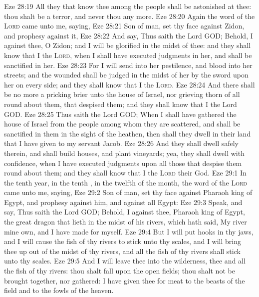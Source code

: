 \vs Eze 28:19 All they that know thee among the people shall be astonished at thee: thou shalt be a terror, and never  thou  any more.
\vs Eze 28:20 Again the word of the \textsc{Lord} came unto me, saying,
\vs Eze 28:21 Son of man, set thy face against Zidon, and prophesy against it,
\vs Eze 28:22 And say, Thus saith the Lord GOD; Behold, I  against thee, O Zidon; and I will be glorified in the midst of thee: and they shall know that I  the \textsc{Lord}, when I shall have executed judgments in her, and shall be sanctified in her.
\vs Eze 28:23 For I will send into her pestilence, and blood into her streets; and the wounded shall be judged in the midst of her by the sword upon her on every side; and they shall know that I  the \textsc{Lord}.
\vs Eze 28:24 And there shall be no more a pricking brier unto the house of Israel, nor  grieving thorn of all  round about them, that despised them; and they shall know that I  the Lord GOD.
\vs Eze 28:25 Thus saith the Lord GOD; When I shall have gathered the house of Israel from the people among whom they are scattered, and shall be sanctified in them in the sight of the heathen, then shall they dwell in their land that I have given to my servant Jacob.
\vs Eze 28:26 And they shall dwell safely therein, and shall build houses, and plant vineyards; yea, they shall dwell with confidence, when I have executed judgments upon all those that despise them round about them; and they shall know that I  the \textsc{Lord} their God.
\vs Eze 29:1 In the tenth year, in the tenth , in the twelfth  of the month, the word of the \textsc{Lord} came unto me, saying,
\vs Eze 29:2 Son of man, set thy face against Pharaoh king of Egypt, and prophesy against him, and against all Egypt:
\vs Eze 29:3 Speak, and say, Thus saith the Lord GOD; Behold, I  against thee, Pharaoh king of Egypt, the great dragon that lieth in the midst of his rivers, which hath said, My river  mine own, and I have made  for myself.
\vs Eze 29:4 But I will put hooks in thy jaws, and I will cause the fish of thy rivers to stick unto thy scales, and I will bring thee up out of the midst of thy rivers, and all the fish of thy rivers shall stick unto thy scales.
\vs Eze 29:5 And I will leave thee  into the wilderness, thee and all the fish of thy rivers: thou shalt fall upon the open fields; thou shalt not be brought together, nor gathered: I have given thee for meat to the beasts of the field and to the fowls of the heaven.
